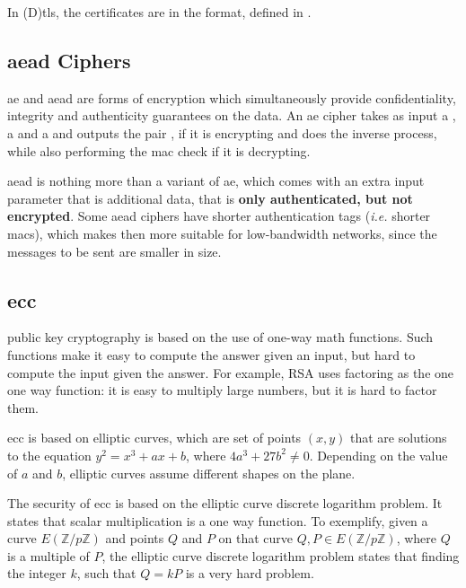 \documentclass{llncs}
\begin{document}
In (D)\gls{tls}, the certificates are in the  format, defined
in \cite{rfc5280}.

\subsection{\gls{aead} Ciphers} \label{aeadciphers}

\gls{ae} and \gls{aead} are forms of encryption which simultaneously provide
confidentiality, integrity and authenticity guarantees on the data. An \gls{ae}
cipher takes as input a , a  and a 
and outputs the pair , if it is encrypting and does the inverse
process, while also performing the \gls{mac} check if it is decrypting.

\gls{aead} is nothing more than a variant of \gls{ae}, which comes with an extra
input parameter that is additional data, that is \textbf{only authenticated, but not encrypted}.
Some \gls{aead} ciphers have shorter authentication tags (\textit{i.e.} shorter \gls{mac}s),
which makes then more suitable for low-bandwidth networks, since the messages to be sent are smaller in size.

\subsection{\gls{ecc}} \label{eccsection}

public key cryptography is based on the use of one-way math functions. Such
functions make it easy to compute the answer given an input,
but hard to compute the input given the answer. For example, RSA uses factoring
as the one one way function: it is easy to multiply large numbers, but it is hard
to factor them.

\gls{ecc} is based on elliptic curves, which are set of points $(x,y)$ that are
solutions to the equation $y^2 = x^3 + ax + b$, where $4a^3 + 27b^2 \neq 0$.
Depending on the value of $a$ and $b$, elliptic curves assume different shapes
on the plane.

The security of \gls{ecc} is based on the elliptic curve discrete logarithm
problem. It states that scalar multiplication is a one way function. To exemplify,
given a curve $E(\mathbb{Z}/p\mathbb{Z})$ and points $Q$ and $P$ on that curve
$Q,P \in E(\mathbb{Z}/p\mathbb{Z})$, where $Q$ is a multiple of $P$, the elliptic curve discrete logarithm problem
states that finding the integer $k$, such that $Q=kP$ is a very hard problem.
\end{document}
